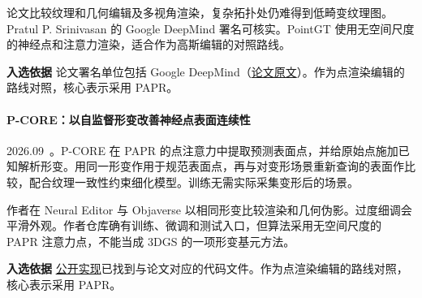 论文比较纹理和几何编辑及多视角渲染，复杂拓扑处仍难得到低畸变纹理图。Pratul P. Srinivasan 的 Google DeepMind 署名可核实。PointGT 使用无空间尺度的神经点和注意力渲染，适合作为高斯编辑的对照路线。

\textbf{入选依据} 论文署名单位包括 Google DeepMind（\href{https://arxiv.org/html/2609.03341v1}{论文原文}）。作为点渲染编辑的路线对照，核心表示采用 PAPR。

\paragraph{P-CORE：以自监督形变改善神经点表面连续性}
2026.09~\cite{2609_03349}。P-CORE 在 PAPR 的点注意力中提取预测表面点，并给原始点施加已知解析形变。用同一形变作用于规范表面点，再与对变形场景重新查询的表面作比较，配合纹理一致性约束细化模型。训练无需实际采集变形后的场景。

作者在 Neural Editor 与 Objaverse 以相同形变比较渲染和几何伪影。过度细调会平滑外观。作者仓库确有训练、微调和测试入口，但算法采用无空间尺度的 PAPR 注意力点，不能当成 3DGS 的一项形变基元方法。

\textbf{入选依据} \href{https://github.com/zvict/p-core}{公开实现}已找到与论文对应的代码文件。作为点渲染编辑的路线对照，核心表示采用 PAPR。

